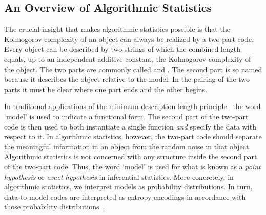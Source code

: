 \subsection{An Overview of Algorithmic Statistics}
\label{sec:statistics:algorithmic}%
The crucial insight that makes algorithmic statistics possible is that the Kolmogorov complexity of an object can always be realized by a two-part code.
Every object can be described by two strings of which the combined length equals, up to an independent additive constant, the Kolmogorov complexity of the object.
The two parts are commonly called  and .
The second part is so named because it describes the object relative to the model.
In the pairing of the two parts it must be clear where one part ends and the other begins.

In traditional applications of the minimum description length principle~\parencite{rissanen1978modeling,rissanen1983universal,vitanyi2000minimum,grunwald2007minimum} the word `model' is used to indicate a functional form.
The second part of the two-part code is then used to both instantiate a single function \emph{and} specify the data with respect to it.
In algorithmic statistics, however, the two-part code should separate the meaningful information in an object from the random noise in that object.
Algorithmic statistics is not concerned with any structure inside the second part of the two-part code.
Thus, the word `model' is used for what is known as a \emph{point hypothesis} or \emph{exact hypothesis} in inferential statistics.
More concretely, in algorithmic statistics, we interpret models as probability distributions.
In turn, data-to-model codes are interpreted as entropy encodings in accordance with those probability distributions~\parencite{vereshchagin2004kolmogorov,cover2006elements}.


